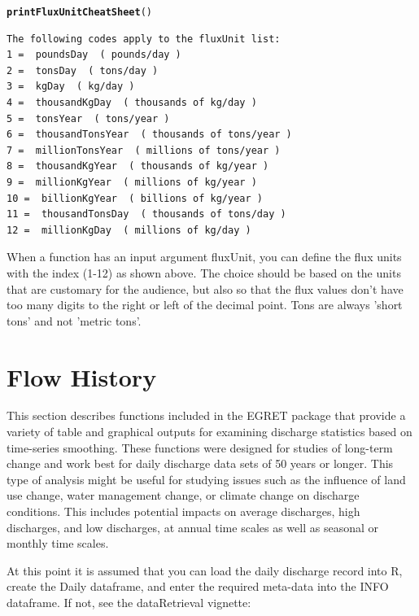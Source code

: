 \documentclass[a4paper,11pt]{article}\usepackage[]{graphicx}\usepackage[]{color}
\makeatletter
\newcommand{\hlstd}[1]{\textcolor[rgb]{0.345,0.345,0.345}{#1}}%
\newcommand{\hlkwd}[1]{\textcolor[rgb]{0.737,0.353,0.396}{\textbf{#1}}}%
\newenvironment{kframe}{%
 \def\at@end@of@kframe{}%
 \ifinner\ifhmode%
  \def\at@end@of@kframe{\end{minipage}}%
  \begin{minipage}{\columnwidth}%
 \fi\fi%
 \def\FrameCommand##1{\hskip\@totalleftmargin \hskip-\fboxsep
 \colorbox{shadecolor}{##1}\hskip-\fboxsep
     \hskip-\linewidth \hskip-\@totalleftmargin \hskip\columnwidth}%
 \MakeFramed {\advance\hsize-\width
   \@totalleftmargin\z@ \linewidth\hsize
   \@setminipage}}%
 {\par\unskip\endMakeFramed%
 \at@end@of@kframe}
\newenvironment{knitrout}{}{} %
\makeatother
\begin{document}
\begin{knitrout}
\color{fgcolor}\begin{kframe}
\begin{alltt}
\hlkwd{printFluxUnitCheatSheet}\hlstd{()}
\end{alltt}
\begin{verbatim}
The following codes apply to the fluxUnit list:
1 =  poundsDay  ( pounds/day )
2 =  tonsDay  ( tons/day )
3 =  kgDay  ( kg/day )
4 =  thousandKgDay  ( thousands of kg/day )
5 =  tonsYear  ( tons/year )
6 =  thousandTonsYear  ( thousands of tons/year )
7 =  millionTonsYear  ( millions of tons/year )
8 =  thousandKgYear  ( thousands of kg/year )
9 =  millionKgYear  ( millions of kg/year )
10 =  billionKgYear  ( billions of kg/year )
11 =  thousandTonsDay  ( thousands of tons/day )
12 =  millionKgDay  ( millions of kg/day )
\end{verbatim}
\end{kframe}
\end{knitrout}

When a function has an input argument fluxUnit, you can define the flux units with the index (1-12) as shown above. The choice should be based on the units that are customary for the audience, but also so that the flux values don't have too many digits to the right or left of the decimal point. Tons are always 'short tons' and not 'metric tons'.

\FloatBarrier

\section{Flow History}
\label{sec:flowHistory}
This section describes functions included in the EGRET package that provide a variety of table and graphical outputs for examining discharge statistics based on time-series smoothing. These functions were designed for studies of long-term change and work best for daily discharge data sets of 50 years or longer. This type of analysis might be useful for studying issues such as the influence of land use change, water management change, or climate change on discharge conditions.  This includes potential impacts on average discharges, high discharges, and low discharges, at annual time scales as well as seasonal or monthly time scales. 

At this point it is assumed that you can load the daily discharge record into R, create the Daily dataframe, and enter the required meta-data into the INFO dataframe. If not, see the dataRetrieval vignette:
\end{document}
